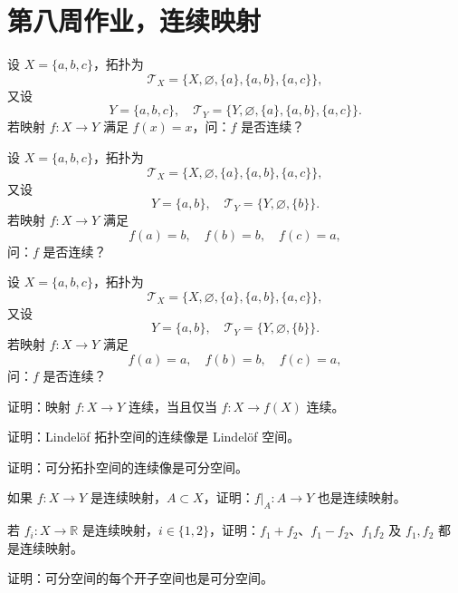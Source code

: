 \section{第八周作业，连续映射}

\begin{homework}[7]
设 $X=\{a,b,c\}$，拓扑为 
\[
\mathcal{T}_X=\{X,\varnothing,\{a\},\{a,b\},\{a,c\}\},
\]
又设
\[
Y=\{a,b,c\},\quad 
\mathcal{T}_Y=\{Y,\varnothing,\{a\},\{a,b\},\{a,c\}\}.
\]
若映射 $f:X\to Y$ 满足 $f(x)=x$，问：$f$ 是否连续？
\end{homework}

\begin{homework}[8]
设 $X=\{a,b,c\}$，拓扑为 
\[
\mathcal{T}_X=\{X,\varnothing,\{a\},\{a,b\},\{a,c\}\},
\]
又设
\[
Y=\{a,b\},\quad 
\mathcal{T}_Y=\{Y,\varnothing,\{b\}\}.
\]
若映射 $f:X\to Y$ 满足 
\[
f(a)=b,\quad f(b)=b,\quad f(c)=a,
\]
问：$f$ 是否连续？
\end{homework}

\begin{homework}[9]
设 $X=\{a,b,c\}$，拓扑为 
\[
\mathcal{T}_X=\{X,\varnothing,\{a\},\{a,b\},\{a,c\}\},
\]
又设
\[
Y=\{a,b\},\quad 
\mathcal{T}_Y=\{Y,\varnothing,\{b\}\}.
\]
若映射 $f:X\to Y$ 满足 
\[
f(a)=a,\quad f(b)=b,\quad f(c)=a,
\]
问：$f$ 是否连续？
\end{homework}

\begin{homework}[12]
证明：映射 $f:X\to Y$ 连续，当且仅当 $f:X\to f(X)$ 连续。
\end{homework}

\begin{homework}[3]
证明：Lindelöf 拓扑空间的连续像是 Lindelöf 空间。
\end{homework}

\begin{homework}[4]
证明：可分拓扑空间的连续像是可分空间。
\end{homework}

\begin{homework}[14]
如果 $f:X\to Y$ 是连续映射，$A\subset X$，证明：$f|_A:A\to Y$ 也是连续映射。
\end{homework}

\begin{homework}[3.2]
若 $f_i:X\to\mathbb{R}$ 是连续映射，$i\in\{1,2\}$，证明：$f_1+f_2$、$f_1-f_2$、$f_1f_2$ 及 $f_1,f_2$ 都是连续映射。
\end{homework}

\begin{homework}[2.1]
证明：可分空间的每个开子空间也是可分空间。
\end{homework}

